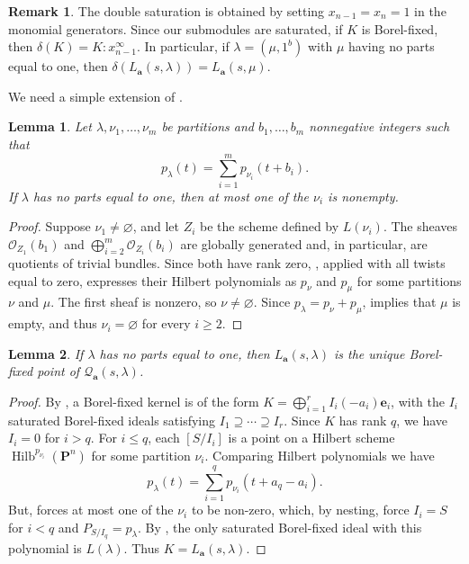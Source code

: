 \documentclass[leqno,11pt,a4paper]{amsart}
\newtheorem{lemma}[lemma]{Lemma}
\theoremstyle{definition}
\newtheorem{remark}[remark]{Remark}
\numberwithin{equation}{section}
\newcommand{\bfa}{\mathbf{a}}
\newcommand{\PP}{\mathbf{P}}
\newcommand{\bfe}{\mathbf{e}}
\newcommand{\OO}{\mathscr{O}}
\newcommand{\QQ}{\mathcal{Q}}
\DeclareMathOperator{\Hilb}{Hilb}
\begin{document}
\begin{remark}
The double saturation is obtained by setting $x_{n-1}=x_n=1$ in the monomial generators. 
Since our submodules are saturated, if $K$ is Borel-fixed, then $\delta(K)=K:x_{n-1}^\infty$.
In particular, if $\lambda=(\mu,1^b)$ with $\mu$ having no parts equal to one, then $\delta(L_{\bfa}(s,\lambda))=L_{\bfa}(s,\mu)$.
\end{remark}

We need a simple extension of \cite[Lemma~2.1]{SSS26}.

\begin{lemma}\label{splitting}
Let $\lambda,\nu_1,\ldots,\nu_m$ be partitions and $b_1,\ldots,b_m$ nonnegative integers such that
$$
p_\lambda(t)=\sum_{i=1}^m p_{\nu_i}(t+b_i).
$$
If $\lambda$ has no parts equal to one, then at most one of the $\nu_i$ is nonempty.
\end{lemma}

\begin{proof}
Suppose $\nu_1\ne\varnothing$, and let $Z_i$ be the scheme defined by $L(\nu_i)$. 
The sheaves $\OO_{Z_1}(b_1)$ and $\bigoplus_{i=2}^m\OO_{Z_i}(b_i)$ are globally generated and, in particular, are quotients of trivial bundles. 
Since both have rank zero, , applied with all twists equal to zero, expresses their Hilbert polynomials as $p_\nu$ and $p_\mu$ for some partitions $\nu$ and $\mu$. 
The first sheaf is nonzero, so $\nu\ne\varnothing$. 
Since $p_\lambda=p_\nu+p_\mu$, \cite[Lemma~2.1]{SSS26} implies that $\mu$ is empty, and thus $\nu_i=\varnothing$ for every $i\geq2$.
\end{proof}

\begin{lemma}\label{residual_unique}
If $\lambda$ has no parts equal to one, then $L_{\bfa}(s,\lambda)$ is the unique Borel-fixed point of $\QQ_{\bfa}(s,\lambda)$.
\end{lemma}

\begin{proof}
By , a Borel-fixed kernel is of the form $K=\bigoplus_{i=1}^r I_i(-a_i)\bfe_i$, with the $I_i$ saturated Borel-fixed ideals satisfying $I_1\supseteq\cdots\supseteq I_r$. 
Since $K$ has rank $q$, we have $I_i=0$ for $i>q$. 
For $i \leq q$, each $[S/I_i]$ is a point on a Hilbert scheme $\Hilb^{p_{\nu_i}}(\PP^n)$ for some partition $\nu_i$.
Comparing Hilbert polynomials we have
$$
p_\lambda(t)=\sum_{i=1}^q p_{\nu_i}(t+a_q-a_i).
$$
But,  forces at most one of the $\nu_i$ to be non-zero, which, by nesting,  force $I_i=S$ for $i<q$ and $P_{S/I_q}=p_\lambda$. 
By \cite[Theorem~1.1]{Staal_smooth_hilbert_schemes}, the only saturated Borel-fixed ideal with this polynomial is $L(\lambda)$.
Thus $K=L_{\bfa}(s,\lambda)$.
\end{proof}
\end{document}
